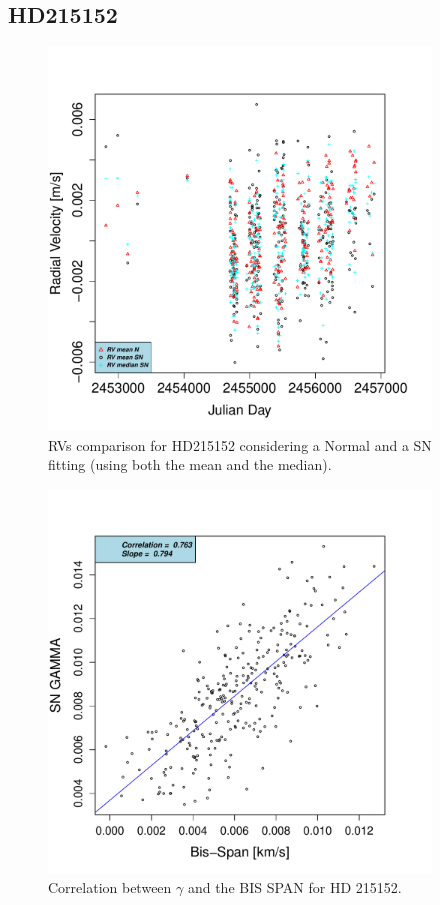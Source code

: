 \documentclass[11pt, oneside]{article}
\begin{document}
\subsection{HD215152}  \label{sec:HD215152}
%
\begin{figure}[htbp]
   \centering
\includegraphics[height = 4in]{[0]HD21515_vs_time.pdf} 
   \caption{RVs comparison for HD215152 considering a Normal and a SN fitting (using both the mean and the median).}
   \label{fig:HD215152:RV}
\end{figure}
%
\begin{figure}[htbp]
   \centering
\includegraphics[height = 4in]{HD21515_[2]gamma_vs_bisspan.pdf} 
   \caption{Correlation between $\gamma$ and the BIS SPAN for HD 215152.}
   \label{fig:HD215152:corr.gamma}
\end{figure}
\end{document}
